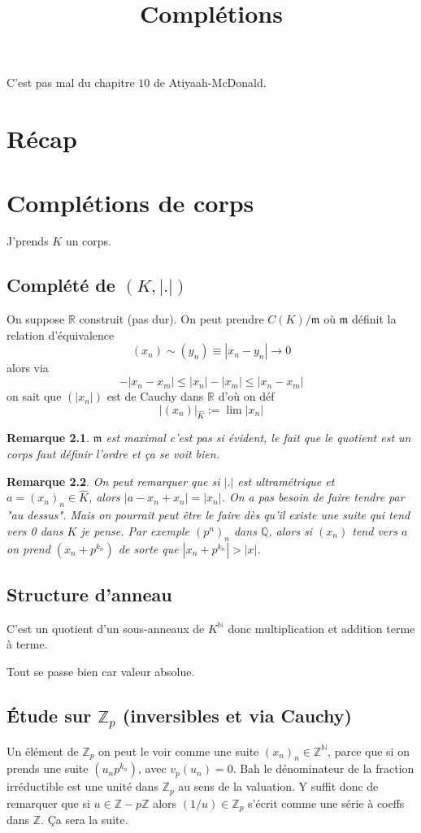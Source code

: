 \documentclass[a4paper,12pt]{book}
\title{Complétions}
\date{}
\newcommand{\Z}{\mathbb{Z}}
\newcommand{\R}{\mathbb{R}}
\newcommand{\Q}{\mathbb{Q}}
\newcommand{\N}{\mathbb{N}}
\newcommand{\m}{\mathfrak m}
\theoremstyle{plain}
\newtheorem{rem}{Remarque}
\theoremstyle{definition}
\theoremstyle{remark}
\begin{document}
\maketitle

C'est pas mal du chapitre $10$ de Atiyaah-McDonald.

\chapter{Récap}
\chapter{Complétions de corps}
J'prends $K$ un corps.
\section{Complété de $(K,|.|)$}
On suppose $\R$ construit (pas dur).
On peut prendre $C(K)/\m$ où $\m$ définit
la relation d'équivalence
\[(x_n)\sim (y_n)\equiv |x_n-y_n|\to 0\]
alors via 
\[-|x_n-x_m|\leq |x_n|-|x_m|\leq |x_n-x_m|\]
on sait que $(|x_n|)$ est de Cauchy dans $\R$
d'où on déf 
\[|(x_n)|_{\hat K} := \lim |x_n|\]

\begin{rem}
    $\m$ est maximal c'est pas si évident,
    le fait que le quotient est un corps faut
    définir l'ordre et ça se voit bien.
\end{rem}

\begin{rem}
    On peut remarquer que si $|.|$ est ultramétrique et
    $a=(x_n)_n\in \hat K$, alors $|a-x_n+x_n|=|x_n|$. On a pas 
    besoin de faire tendre par "au dessus". Mais on pourrait peut
    être le faire dès qu'il existe 
    une suite qui tend vers 0 dans $K$ je pense. Par exemple
    $(p^n)_n$ dans $\Q$, alors si $(x_n)$ tend vers $a$ on prend
    $(x_n+p^{k_n})$ de sorte que $|x_n+p^{k_n}|>|x|$.
\end{rem}

\section{Structure d'anneau}
C'est un quotient d'un sous-anneaux de
$K^\N$ donc multiplication et addition terme à terme.
\begin{rm}
    Tout se passe bien car valeur absolue.
\end{rm}
\section{Étude sur $\Z_p$ (inversibles et via Cauchy)}
Un élément de $\Z_p$ on peut le voir comme une suite 
$(x_n)_n\in \Z^\N$, parce que si on prends une suite
$(u_np^{k_n})$, avec $v_p(u_n)=0$. Bah le dénominateur
de la fraction irréductible est une unité dans $\Z_p$
au sens de la valuation.
Y suffit donc de remarquer que si $u\in \Z-p\Z$ alors
$(1/u)\in \Z_p$ s'écrit comme une série à coeffs
dans $\Z$. Ça sera la suite.
\end{document}
